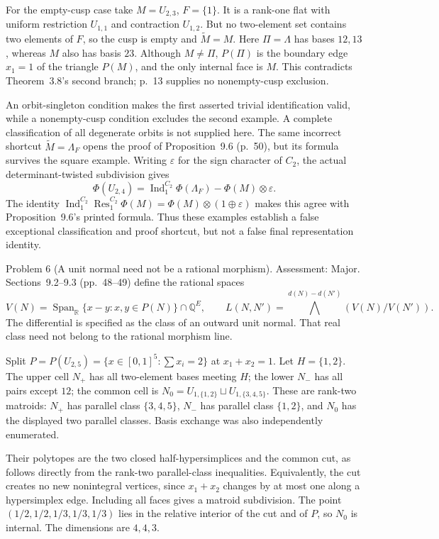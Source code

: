 \documentclass[10pt]{article}
\begin{document}
For the empty-cusp case take \(M=U_{2,3}\), \(F=\{1\}\). It is a rank-one flat with uniform restriction \(U_{1,1}\) and contraction \(U_{1,2}\). But no two-element set contains two elements of \(F\), so the cusp is empty and \(\widetilde M=M\). Here \(\Pi=\Lambda\) has bases \(12,13\), whereas \(M\) also has basis \(23\). Although \(M\ne\Pi\), \(P(\Pi)\) is the boundary edge \(x_1=1\) of the triangle \(P(M)\), and the only internal face is \(M\). This contradicts Theorem 3.8’s second branch; p. 13 supplies no nonempty-cusp exclusion.\par
An orbit-singleton condition makes the first asserted trivial identification valid, while a nonempty-cusp condition excludes the second example. A complete classification of all degenerate orbits is not supplied here. The same incorrect shortcut \(\widetilde M=\Lambda_F\) opens the proof of Proposition 9.6 (p. 50), but its formula survives the square example. Writing \(\varepsilon\) for the sign character of \(C_2\), the actual determinant-twisted subdivision gives \[\Phi(U_{2,4})=\operatorname{Ind}_1^{C_2}\Phi(\Lambda_F)-\Phi(M)\otimes\varepsilon.\] The identity \(\operatorname{Ind}_1^{C_2}\operatorname{Res}_1^{C_2}\Phi(M)=\Phi(M)\otimes(1\oplus\varepsilon)\) makes this agree with Proposition 9.6’s printed formula. Thus these examples establish a false exceptional classification and proof shortcut, but not a false final representation identity.\par
Problem 6 (A unit normal need not be a rational morphism).  Assessment: Major. Sections 9.2–9.3 (pp. 48–49) define the rational spaces \[V(N)=\operatorname{Span}_{\mathbb R}\{x-y:x,y\in P(N)\}\cap\mathbb Q^E,\qquad
 L(N,N')=\bigwedge^{d(N)-d(N')}(V(N)/V(N')).\] The differential is specified as the class of an outward unit normal. That real class need not belong to the rational morphism line.\par
Split \(P=P(U_{2,5})=\{x\in[0,1]^5:\sum x_i=2\}\) at \(x_1+x_2=1\). Let \(H=\{1,2\}\). The upper cell \(N_+\) has all two-element bases meeting \(H\); the lower \(N_-\) has all pairs except \(12\); the common cell is \(N_0=U_{1,\{1,2\}}\sqcup U_{1,\{3,4,5\}}\). These are rank-two matroids: \(N_+\) has parallel class \(\{3,4,5\}\), \(N_-\) has parallel class \(\{1,2\}\), and \(N_0\) has the displayed two parallel classes. Basis exchange was also independently enumerated.\par
Their polytopes are the two closed half-hypersimplices and the common cut, as follows directly from the rank-two parallel-class inequalities. Equivalently, the cut creates no new nonintegral vertices, since \(x_1+x_2\) changes by at most one along a hypersimplex edge. Including all faces gives a matroid subdivision. The point \((1/2,1/2,1/3,1/3,1/3)\) lies in the relative interior of the cut and of \(P\), so \(N_0\) is internal. The dimensions are \(4,4,3\).\par
\end{document}
